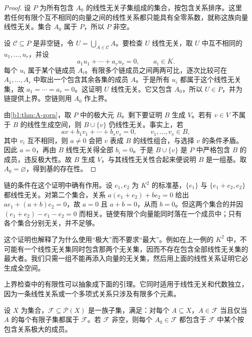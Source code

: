 \begin{proof}
	设 \(P\) 为所有包含 \(A_0\) 的线性无关子集组成的集合，按包含关系排序。这里若任何有限个互不相同的向量之间的线性关系都只能具有全零系数，就称这族向量线性无关。集合 \(A_0\) 属于 \(P\)，所以 \(P\) 非空。

	设 \(\mathcal C\subseteq P\) 是非空链，令 \(U=\bigcup_{A\in\mathcal C}A\)。要检查 \(U\) 线性无关，取 \(U\) 中互不相同的 \(u_1,\ldots,u_r\)，并设
	\[
		a_1u_1+\cdots+a_ru_r=0,\qquad a_i\in K.
	\]
	每个 \(u_i\) 属于某个链成员 \(A_i\)。有限多个链成员之间两两可比，逐次比较可在 \(A_1,\ldots,A_r\) 中取出一个包含其余各集的成员 \(A\)。于是所有 \(u_i\) 都属于这个线性无关集，故 \(a_1=\cdots=a_r=0\)。这证明 \(U\) 线性无关。它又包含 \(A_0\)，所以 \(U\in P\)，并为链提供上界。空链则用 \(A_0\) 作上界。

	由\cref{b1:thm:A-zorn}，取 \(P\) 中的极大元 \(B\)。剩下要证明 \(B\) 生成 \(V\)。若有 \(v\in V\) 不属于 \(B\) 的线性生成空间，则 \(B\cup\{v\}\) 仍线性无关。事实上，若
	\[
		av+b_1v_1+\cdots+b_sv_s=0, \qquad v_1,\ldots,v_s\in B,
	\]
	其中 \(v_i\) 互不相同，则 \(a\ne0\) 会把 \(v\) 表成 \(B\) 的线性组合，与选择 \(v\) 的条件矛盾。因此 \(a=0\)，再由 \(B\) 线性无关得全部 \(b_i=0\)。于是 \(B\cup\{v\}\) 是 \(P\) 中严格包含 \(B\) 的成员，违反极大性。故 \(B\) 生成 \(V\)，与其线性无关性合起来便说明 \(B\) 是一组基。取 \(A_0=\varnothing\)，得到基的存在性。
\end{proof}

链的条件在这个证明中确有作用。设 \(e_1,e_2\) 为 \(K^2\) 的标准基，\(\{e_1\}\) 与 \(\{e_1+e_2,e_2\}\) 都线性无关。对第二个集合，关系 \(a(e_1+e_2)+be_2=0\) 给出 \(ae_1+(a+b)e_2=0\)，故 \(a=0\) 且 \(a+b=0\)，从而 \(b=0\)。但这两个集合的并因 \((e_1+e_2)-e_1-e_2=0\) 而相关。链使有限个向量能同时落在一个成员中；只有各个集合分别无关，并不足够。

\ProseParagraphBreak
这个证明也解释了为什么使用“极大”而不要求“最大”。例如在上一例的 \(K^2\) 中，不可能有一个线性无关集同时包含那两个无关集，因而不存在包含全部线性无关集的最大者。我们只需一组不能再添入向量的无关集，然后用上面的线性关系证明它必生成全空间。

\ProseParagraphBreak
上界检查中的有限性可以抽象成下面的引理。它同时适用于线性无关和代数独立，因为一条线性关系或一个多项式关系只涉及有限多个元素。

\begin{lemma}\label{b1:lem:finite-character-union}
	设 \(X\) 为集合，\(\mathscr F\subseteq\mathcal P(X)\) 是一族子集，满足：对每个 \(A\subseteq X\)，\(A\in\mathscr F\) 当且仅当 \(A\) 的每个有限子集都属于 \(\mathscr F\)。若 \(\mathscr F\) 非空，则每个 \(A_0\in\mathscr F\) 都包含于 \(\mathscr F\) 中某个按包含关系极大的成员。
\end{lemma}

